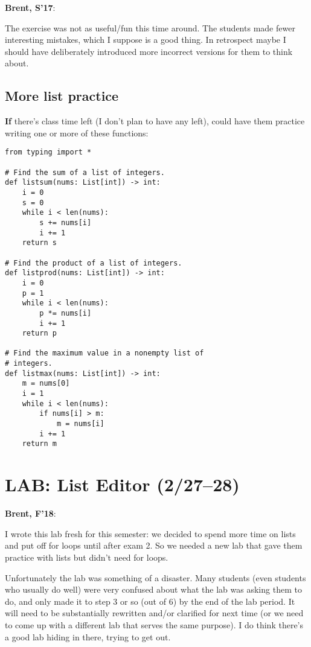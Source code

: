 \documentclass{article}
\newenvironment{reflect}[1]
{
  \noindent
  \begin{lrbox}{\reflectbox}
    \begin{minipage}[t]{\textwidth}
      \textbf{#1}:
}{
    \end{minipage}
  \end{lrbox}
  \fbox{\usebox{\reflectbox}}
}
\newcommand{\notready}{\textcolor{red}{\XSolidBold}\xspace}
\begin{document}
\begin{reflect}{Brent, S'17}
  The exercise was not as useful/fun this time around.  The students
  made fewer interesting mistakes, which I suppose is a good thing.
  In retrospect maybe I should have deliberately introduced more
  incorrect versions for them to think about.
\end{reflect}

\subsection*{More list practice}

\textbf{If} there's class time left (I don't plan to have any left),
could have them practice writing one or more of these functions:

\begin{verbatim}
from typing import *

# Find the sum of a list of integers.
def listsum(nums: List[int]) -> int:
    i = 0
    s = 0
    while i < len(nums):
        s += nums[i]
        i += 1
    return s

# Find the product of a list of integers.
def listprod(nums: List[int]) -> int:
    i = 0
    p = 1
    while i < len(nums):
        p *= nums[i]
        i += 1
    return p

# Find the maximum value in a nonempty list of
# integers.
def listmax(nums: List[int]) -> int:
    m = nums[0]
    i = 1
    while i < len(nums):
        if nums[i] > m:
            m = nums[i]
        i += 1
    return m
\end{verbatim}

\newpage
\section*{\notready LAB: List Editor (2/27--28)}

\begin{reflect}{Brent, F'18}
  I wrote this lab fresh for this semester: we decided to spend more
  time on lists and put off for loops until after exam 2.  So we
  needed a new lab that gave them practice with lists but didn't need
  for loops.

  Unfortunately the lab was something of a disaster.  Many students
  (even students who usually do well) were very confused about what
  the lab was asking them to do, and only made it to step 3 or so (out
  of 6) by the end of the lab period.  It will need to be
  substantially rewritten and/or clarified for next time (or we need
  to come up with a different lab that serves the same purpose).  I do
  think there's a good lab hiding in there, trying to get out.
\end{reflect}
\end{document}
